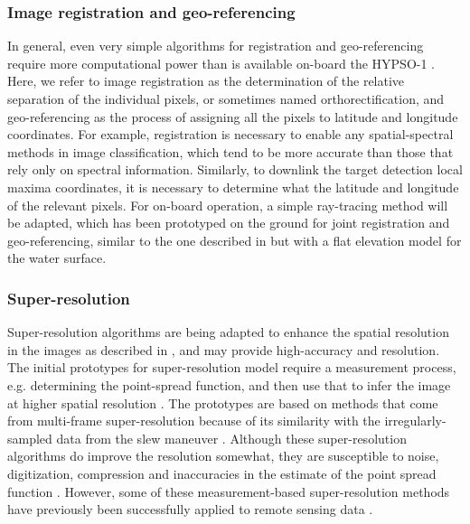 \subsubsection{Image registration and geo-referencing}
In general, even very simple algorithms for registration and geo-referencing require more computational power than is available on-board the HYPSO-1 \cite{Opsahl_2011}. Here, we refer to image registration as the determination of the relative separation of the individual pixels, or sometimes named orthorectification, and geo-referencing as the process of assigning all the pixels to latitude and longitude coordinates. For example, registration is necessary to enable any spatial-spectral methods in image classification, which tend to be more accurate than those that rely only on spectral information. Similarly, to downlink the target detection local maxima coordinates, it is necessary to determine what the latitude and longitude of the relevant pixels. For on-board operation, a simple ray-tracing method will be adapted, which has been prototyped on the ground for joint registration and geo-referencing, similar to the one described in \cite{Schlapfer2002} but with a flat elevation model for the water surface. 

\subsubsection{Super-resolution}
Super-resolution algorithms are being adapted to enhance the spatial resolution in the images as described in \cite{Park2003}, and may provide high-accuracy and resolution. The initial prototypes for super-resolution model require a measurement process, e.g. determining the point-spread function, and then use that to infer the image at higher spatial resolution \cite{Garrett2019}. The prototypes are based on methods that come from multi-frame super-resolution because of its similarity with the irregularly-sampled data from the slew maneuver \cite{stark_high-resolution_1989, farsiu_fast_2004}. 
Although these super-resolution algorithms do improve the resolution somewhat, they are susceptible to noise, digitization, compression and inaccuracies in the estimate of the point spread function \cite{Baker2002,Kohler2019}. 
However, some of these measurement-based super-resolution methods have previously been successfully applied to remote sensing data \cite{clarisse2019tracking}. 

